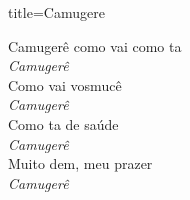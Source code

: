 \documentclass[fontsize=14pt, twoside]{scrreprt}
\begin{document}
\begin{multicols*}{2}
\begin{song}{title={Camugere}}
        \begin{verse*}
            Camugerê como vai como ta\\
            \textit{Camugerê}\\
            Como vai vosmucê\\
            \textit{Camugerê}\\
            Como ta de saúde\\
            \textit{Camugerê}\\
            Muito dem, meu prazer\\
            \textit{Camugerê}\\
        \end{verse*}
\end{song}


\columnbreak


\end{multicols*}
\end{document}
